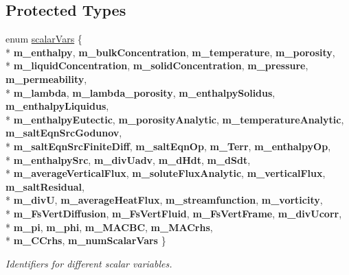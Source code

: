 \subsection*{Protected Types}
\begin{DoxyCompactItemize}
\item 
enum \hyperlink{class_a_m_r_level_mushy_layer_a664250846ba0de6313177ed258c1d9f4}{scalar\-Vars} \{ \\*
{\bfseries m\-\_\-enthalpy}, 
{\bfseries m\-\_\-bulk\-Concentration}, 
{\bfseries m\-\_\-temperature}, 
{\bfseries m\-\_\-porosity}, 
\\*
{\bfseries m\-\_\-liquid\-Concentration}, 
{\bfseries m\-\_\-solid\-Concentration}, 
{\bfseries m\-\_\-pressure}, 
{\bfseries m\-\_\-permeability}, 
\\*
{\bfseries m\-\_\-lambda}, 
{\bfseries m\-\_\-lambda\-\_\-porosity}, 
{\bfseries m\-\_\-enthalpy\-Solidus}, 
{\bfseries m\-\_\-enthalpy\-Liquidus}, 
\\*
{\bfseries m\-\_\-enthalpy\-Eutectic}, 
{\bfseries m\-\_\-porosity\-Analytic}, 
{\bfseries m\-\_\-temperature\-Analytic}, 
{\bfseries m\-\_\-salt\-Eqn\-Src\-Godunov}, 
\\*
{\bfseries m\-\_\-salt\-Eqn\-Src\-Finite\-Diff}, 
{\bfseries m\-\_\-salt\-Eqn\-Op}, 
{\bfseries m\-\_\-\-Terr}, 
{\bfseries m\-\_\-enthalpy\-Op}, 
\\*
{\bfseries m\-\_\-enthalpy\-Src}, 
{\bfseries m\-\_\-div\-Uadv}, 
{\bfseries m\-\_\-d\-Hdt}, 
{\bfseries m\-\_\-d\-Sdt}, 
\\*
{\bfseries m\-\_\-average\-Vertical\-Flux}, 
{\bfseries m\-\_\-solute\-Flux\-Analytic}, 
{\bfseries m\-\_\-vertical\-Flux}, 
{\bfseries m\-\_\-salt\-Residual}, 
\\*
{\bfseries m\-\_\-div\-U}, 
{\bfseries m\-\_\-average\-Heat\-Flux}, 
{\bfseries m\-\_\-streamfunction}, 
{\bfseries m\-\_\-vorticity}, 
\\*
{\bfseries m\-\_\-\-Fs\-Vert\-Diffusion}, 
{\bfseries m\-\_\-\-Fs\-Vert\-Fluid}, 
{\bfseries m\-\_\-\-Fs\-Vert\-Frame}, 
{\bfseries m\-\_\-div\-Ucorr}, 
\\*
{\bfseries m\-\_\-pi}, 
{\bfseries m\-\_\-phi}, 
{\bfseries m\-\_\-\-M\-A\-C\-B\-C}, 
{\bfseries m\-\_\-\-M\-A\-Crhs}, 
\\*
{\bfseries m\-\_\-\-C\-Crhs}, 
{\bfseries m\-\_\-num\-Scalar\-Vars}
 \}
\begin{DoxyCompactList}\small\item\em Identifiers for different scalar variables. \end{DoxyCompactList}\item 

\end{DoxyCompactItemize}
